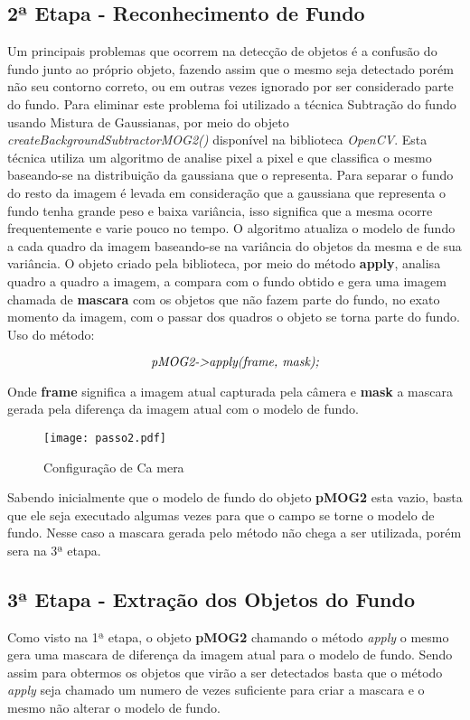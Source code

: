 	\subsection{2ª Etapa - Reconhecimento de Fundo}
	Um principais problemas que ocorrem na detecção de objetos é a confusão do fundo junto ao próprio objeto, fazendo assim que o mesmo seja detectado porém não seu contorno correto, ou em outras vezes ignorado por ser considerado parte do fundo. Para eliminar este problema foi utilizado a técnica  Subtração do fundo usando Mistura de Gaussianas, por meio do objeto \textit{createBackgroundSubtractorMOG2()} disponível na biblioteca \textit{OpenCV}. Esta técnica utiliza um algoritmo de analise pixel a pixel e que classifica o mesmo baseando-se na distribuição da gaussiana que o representa. Para separar o fundo do resto da imagem é levada em consideração que a gaussiana que representa o fundo tenha grande peso e baixa variância, isso significa que a mesma ocorre frequentemente e varie pouco no tempo. O algoritmo atualiza o modelo de fundo a cada quadro da imagem baseando-se na variância do objetos da mesma e de sua variância. O objeto criado pela biblioteca, por meio do método \textbf{apply}, analisa quadro a quadro a imagem, a compara com o fundo obtido e gera uma imagem chamada de \textbf{mascara} com os objetos que não fazem parte do fundo, no exato momento da imagem, com o passar dos quadros o objeto se torna parte do fundo. Uso do método:
\begin{center}
 \begin{displaymath}  \centering \textit{pMOG2->apply(frame, mask);}  \end{displaymath}
\end{center}

Onde \textbf{frame} significa a imagem atual capturada pela câmera e \textbf{mask} a mascara gerada pela diferença da imagem atual com o modelo de fundo. 

\begin{figure}[H]
			\centering
			\texttt{[image: passo2.pdf]}
			\caption{Configuração de Ca mera}
			\label{Configuracao}
		\end{figure}		


Sabendo inicialmente que o modelo de fundo do objeto \textbf{pMOG2} esta vazio, basta que ele seja executado algumas vezes para que o campo se torne o modelo de fundo. Nesse caso a mascara gerada pelo método não chega a ser utilizada, porém sera na 3ª etapa.
	\subsection{3ª Etapa - Extração dos Objetos do Fundo}
	Como visto na 1ª etapa, o objeto \textbf{pMOG2} chamando o método \textit{apply} o mesmo gera uma mascara de diferença da imagem atual para o modelo de fundo. Sendo assim para obtermos os objetos que virão a ser detectados basta que o método \textit{apply} seja chamado um numero de vezes suficiente para criar a mascara e o mesmo não alterar o modelo de fundo.
	
